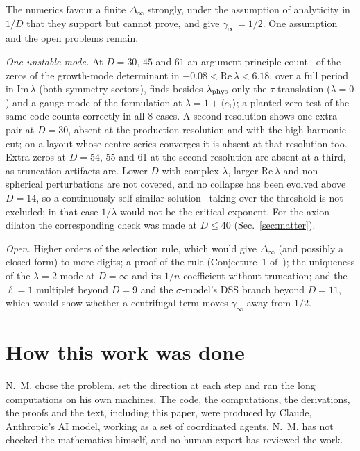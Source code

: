 \documentclass[aps,prd,onecolumn,superscriptaddress,nofootinbib,10pt]{revtex4-2}
\newcommand{\Dinf}{\Delta_\infty}
\begin{document}
The numerics favour a finite $\Dinf$ strongly, under the assumption of analyticity in $1/D$ that they support but cannot
prove, and give $\gamma_\infty = 1/2$. One assumption and the open problems remain.

\emph{One unstable mode.} At $D = 30$, $45$ and $61$ an argument-principle
count~\cite{HirschmannEardley1995b,Gundlach1997} of the zeros of the growth-mode
determinant in $-0.08 < \mathrm{Re}\,\lambda < 6.18$, over a full period in $\mathrm{Im}\,\lambda$ (both symmetry sectors), finds
besides $\lambda_{\rm phys}$ only the $\tau$ translation ($\lambda = 0$) and a gauge mode of the formulation at
$\lambda = 1 + \langle c_1\rangle$; a planted-zero test of the same code counts correctly in all 8 cases. A second resolution
shows one extra pair at $D = 30$, absent at the production resolution and with the high-harmonic cut; on a layout whose
centre series converges it is absent at that resolution too. Extra zeros at $D = 54$, 55 and 61 at the second resolution
are absent at a third, as truncation artifacts are. Lower $D$ with complex $\lambda$, larger $\mathrm{Re}\,\lambda$ and
non-spherical perturbations are not covered, and no collapse has been evolved above $D = 14$, so a continuously
self-similar solution~\cite{ClarkPimentel2025} taking over the threshold is not excluded; in that case $1/\lambda$ would
not be the critical exponent. For the axion--dilaton the corresponding check was made at $D \le 40$
(Sec.~\ref{sec:matter}).

\emph{Open.} Higher orders of the selection rule, which would give $\Dinf$ (and possibly a closed form) to more digits;
a proof of the rule (Conjecture~1 of~\cite{math}); the uniqueness of the $\lambda = 2$ mode at $D = \infty$ and its $1/n$
coefficient without truncation; and the $\ell = 1$ multiplet
beyond $D = 9$ and the $\sigma$-model's DSS branch beyond $D = 11$, which would show whether a centrifugal term moves $\gamma_\infty$ away
from $1/2$.

\section{How this work was done}
\label{sec:how}

N.~M. chose the problem, set the direction at each step and ran the long computations on his own machines. The code, the
computations, the derivations, the proofs and the text, including this paper, were produced by Claude, Anthropic's AI
model, working as a set of coordinated agents. N.~M. has not checked the mathematics himself, and no human expert has
reviewed the work.
\end{document}
